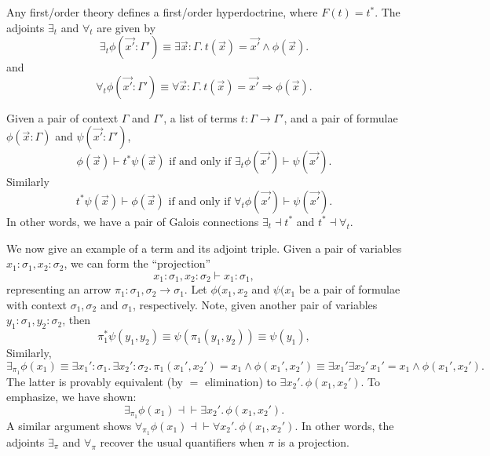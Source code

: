 \documentclass{../thesis-note}
\begin{document}
Any first\-/order theory defines a first\-/order hyperdoctrine, where \(F(t) =
t^*\). The adjoints \(\exists_t\) and \(\forall_t\) are given by
\[%
  \exists_t \phi( \vec{x'} : \Gamma' ) \equiv \exists \vec{x} : \Gamma
  .\, t(\vec{x}) = \vec{x'} \wedge \phi(\vec{x}).
\]%
and
\[%
  \forall_t \phi(\vec{x'} : \Gamma' ) \equiv \forall \vec{x} : \Gamma.\,
  t(\vec{x}) = \vec{x'} \Rightarrow \phi(\vec{x}).
\]%
\begin{theorem}
  Given a pair of context \(\Gamma\) and \(\Gamma'\), a list of terms \(t :
  \Gamma \to \Gamma'\), and a pair of formulae \(\phi( \vec{x} : \Gamma )\) and
  \(\psi(\vec{x'} : \Gamma')\),
  \[%
    \phi(\vec{x}) \vdash t^* \psi(\vec{x}) \text{ if and only if } \exists_t
    \phi(\vec{x'}) \vdash \psi(\vec{x'}).
  \]%
  Similarly
  \[%
    t^* \psi(\vec{x}) \vdash \phi(\vec{x}) \text{ if and only if } \forall_t
    \phi(\vec{x'}) \vdash \psi(\vec{x'}).
  \]%
  In other words, we have a pair of Galois connections \(\exists_t \dashv t^*\)
  and \(t^* \dashv \forall_t\).
\end{theorem}

We now give an example of a term and its adjoint triple. Given a pair of
variables \(x_1 : \sigma_1, x_2 : \sigma_2\), we can form the ``projection''
\[%
  x_1 : \sigma_1, x_2: \sigma_2 \vdash x_1 : \sigma_1,
\]%
representing an arrow \(\pi_1 : \sigma_1,\sigma_2 \to \sigma_1\). Let
\(\phi(x_1,x_2\) and \(\psi(x_1\) be a pair of formulae with context
\(\sigma_1,\sigma_2\) and \(\sigma_1\), respectively. Note, given another pair
of variables \(y_1 : \sigma_1, y_2 : \sigma_2\), then
\[%
  \pi_1^* \psi(y_1,y_2) \equiv \psi(\pi_1(y_1,y_2)) \equiv \psi(y_1),
\]%
Similarly,
\[%
  \exists_{\pi_1} \phi(x_1) \equiv \exists x_1' : \sigma_1.\, \exists x_2' :
  \sigma_2 .\, \pi_1(x_1',x_2') = x_1 \wedge \phi(x_1',x_2') \equiv \exists x_1'
  \exists x_2' \, x_1' = x_1 \wedge \phi(x_1',x_2').
\]%
The latter is provably equivalent (by \(=\) elimination) to \(\exists x_2'
.\, \phi(x_1, x_2')\). To emphasize, we have shown:
\[%
  \exists_{\pi_1} \phi(x_1) \dashv \vdash \exists x_2' .\, \phi(x_1,x_2').
\]%
A similar argument shows \(\forall_{\pi_1} \phi(x_1) \dashv\vdash \forall x_2'
.\, \phi(x_1,x_2')\). In other words, the adjoints \(\exists_\pi\) and
\(\forall_\pi\) recover the usual quantifiers when \(\pi\) is a projection.



\end{document}
